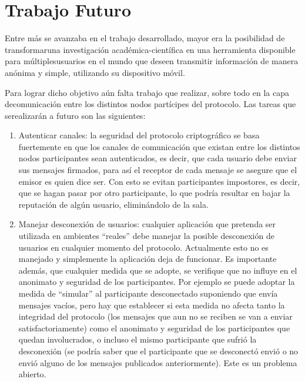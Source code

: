 \chapter{Trabajo Futuro}\label{cap6}

Entre más se avanzaba en el trabajo desarrollado, mayor era la posibilidad de 
transformaruna investigación académica-científica en una herramienta 
disponible para múltiplesusuarios en el mundo que deseen transmitir 
información de manera anónima y simple, utilizando su dispositivo móvil.

Para lograr dicho objetivo aún falta trabajo que realizar, sobre todo en la 
capa decomunicación entre los distintos nodos partícipes del protocolo. Las 
tareas que serealizarán a futuro son las siguientes:

\begin{enumerate}
    \item Autenticar canales: la seguridad del protocolo criptográfico se basa 
    fuertemente en que los canales de comunicación que existan entre los 
    distintos nodos participantes sean autenticados, es decir, que cada 
    usuario debe enviar sus mensajes firmados, para así el receptor de cada 
    mensaje se asegure que el emisor es quien dice ser. Con esto se evitan 
    participantes impostores, es decir, que se hagan pasar por otro 
    participante, lo que podría resultar en bajar la reputación de algún 
    usuario, eliminándolo de la sala.
    
    \item Manejar desconexión de usuarios: cualquier aplicación que pretenda 
    ser utilizada en ambientes ``reales'' debe manejar la posible desconexión 
    de usuarios en cualquier momento del protocolo. Actualmente esto no es 
    manejado y simplemente la aplicación deja de funcionar. Es importante 
    además, que cualquier medida que se adopte, se verifique que no influye en 
    el anonimato y seguridad de los participantes. Por ejemplo se puede 
    adoptar la medida de ``simular'' al participante desconectado suponiendo 
    que envía mensajes vacíos, pero hay que establecer si esta medida no 
    afecta tanto la integridad del protocolo (los mensajes que aun no se 
    reciben se van a enviar satisfactoriamente) como el anonimato y seguridad 
    de los participantes que quedan involucrados, o incluso el mismo 
    participante que sufrió la desconexión (se podría saber que el 
    participante que se desconectó envió o no envió alguno de los mensajes 
    publicados anteriormente). Este es un problema abierto.
    

\end{enumerate}
